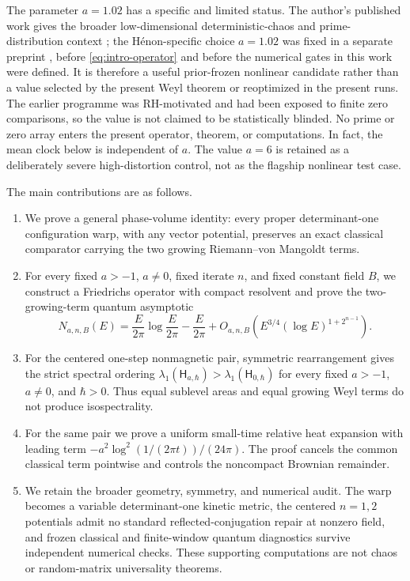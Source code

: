The parameter \(a=1.02\) has a specific and limited status.  The author's
published work gives the broader low-dimensional deterministic-chaos and
prime-distribution context \citep{Wang2026PrimeChaos}; the H\'enon-specific
choice \(a=1.02\) was fixed in a separate preprint
\citep{Wang2026HenonPreprint}, before \cref{eq:intro-operator} and before the
numerical gates in this work were defined.  It is therefore a useful
prior-frozen nonlinear candidate rather than a value selected by the present
Weyl theorem or reoptimized in the present runs.  The earlier programme was
RH-motivated and had been exposed to finite zero comparisons, so the value is
not claimed to be statistically blinded.  No prime or zero array enters the
present operator, theorem, or computations.  In fact, the mean clock below is
independent of \(a\).  The value \(a=6\) is retained as a deliberately severe
high-distortion control, not as the flagship nonlinear test case.

The main contributions are as follows.
\begin{enumerate}[label=(\roman*),leftmargin=8mm]
 \item We prove a general phase-volume identity: every proper
 determinant-one configuration warp, with any vector potential, preserves
 an exact classical comparator carrying the two growing
 Riemann--von Mangoldt terms.
 \item For every fixed \(a>-1\), \(a\neq0\), fixed iterate \(n\), and fixed constant
 field \(B\), we construct a Friedrichs operator with compact resolvent and
 prove the two-growing-term quantum asymptotic
 \[
 N_{a,n,B}(E)=\frac{E}{2\pi}\log\frac{E}{2\pi}
 -\frac{E}{2\pi}+
 O_{a,n,B}\!\left(E^{3/4}(\log E)^{1+2^{n-1}}\right).
 \]
 \item For the centered one-step nonmagnetic pair, symmetric rearrangement
 gives the strict spectral ordering
 \(\lambda_1(\mathsf H_{a,\hbar})>\lambda_1(\mathsf H_{0,\hbar})\) for every fixed
 \(a>-1\), \(a\ne0\), and \(\hbar>0\).  Thus equal sublevel areas and equal growing
 Weyl terms do not produce isospectrality.
 \item For the same pair we prove a uniform small-time relative heat
 expansion with leading term
 \(-a^2\log^2(1/(2\pi t))/(24\pi)\).  The proof cancels the common
 classical term pointwise and controls the noncompact Brownian remainder.
 \item We retain the broader geometry, symmetry, and numerical audit.  The
 warp becomes a variable determinant-one kinetic metric, the centered
 \(n=1,2\) potentials admit no standard reflected-conjugation repair at
 nonzero field, and frozen classical and finite-window quantum diagnostics
 survive independent numerical checks.  These supporting computations are
 not chaos or random-matrix universality theorems.
\end{enumerate}

